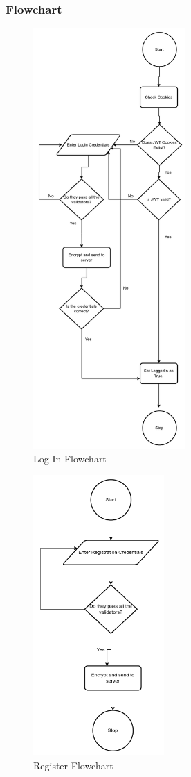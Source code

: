 \documentclass[12pt]{article}
\begin{document}
\subsubsection{Flowchart}
\begin{figure}[h]
    \centerline{\includegraphics[height = 160mm]{login.drawio.png}}
    \caption{Log In Flowchart}
    \label{fig}
\end{figure}
\begin{figure}[h]
    \centerline{\includegraphics[width = 50mm]{register.drawio.png}}
    \caption{Register Flowchart}
    \label{fig}
\end{figure}
\end{document}
